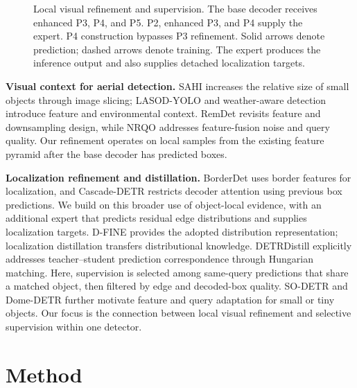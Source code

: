 \begin{figure}[t]
\caption{Local visual refinement and supervision. The base decoder receives enhanced P3, P4, and P5. P2, enhanced P3, and P4 supply the expert. P4 construction bypasses P3 refinement. Solid arrows denote prediction; dashed arrows denote training. The expert produces the inference output and also supplies detached localization targets.}
\label{fig:architecture}
\end{figure}


\textbf{Visual context for aerial detection.} SAHI \cite{akyon2022sahi} increases the relative size of small objects through image slicing; LASOD-YOLO \cite{wang2026lasod} and weather-aware detection \cite{kim2024weather} introduce feature and environmental context. RemDet \cite{li2025remdet} revisits feature and downsampling design, while NRQO \cite{fang2025nrqo} addresses feature-fusion noise and query quality. Our refinement operates on local samples from the existing feature pyramid after the base decoder has predicted boxes.


\textbf{Localization refinement and distillation.} BorderDet \cite{qiu2020borderdet} uses border features for localization, and Cascade-DETR \cite{ye2023cascadedetr} restricts decoder attention using previous box predictions. We build on this broader use of object-local evidence, with an additional expert that predicts residual edge distributions and supplies localization targets. D-FINE \cite{peng2025dfine} provides the adopted distribution representation; localization distillation \cite{zheng2022ld} transfers distributional knowledge. DETRDistill \cite{chang2023detrdistill} explicitly addresses teacher--student prediction correspondence through Hungarian matching. Here, supervision is selected among same-query predictions that share a matched object, then filtered by edge and decoded-box quality. SO-DETR \cite{zhang2025sodetr} and Dome-DETR \cite{hu2025domedetr} further motivate feature and query adaptation for small or tiny objects. Our focus is the connection between local visual refinement and selective supervision within one detector.


\section{Method}

